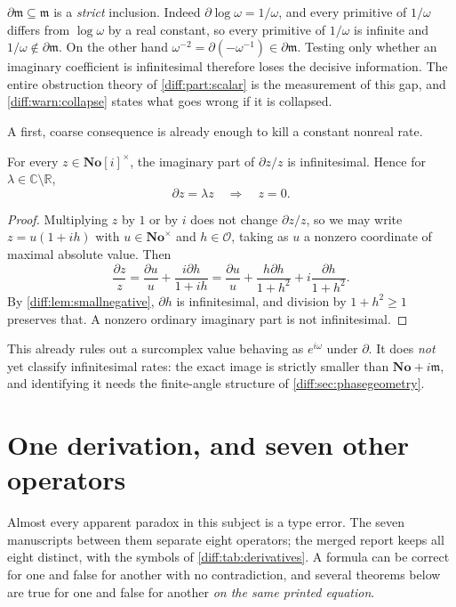 \documentclass[11pt,letterpaper]{article}
\numberwithin{equation}{section}
\theoremstyle{definition}
\theoremstyle{remark}
\newcommand{\No}{\mathbf{No}}
\newcommand{\SC}{\mathbf{No}[i]}
\newcommand{\R}{\mathbb R}
\newcommand{\C}{\mathbb C}
\newcommand{\der}{\partial}
\newcommand{\Ofin}{\mathcal O}
\newcommand{\mm}{\mathfrak m}
\begin{document}
\begin{warning}
\label{diff:warn:strict}
$\der\mm\subseteq\mm$ is a \emph{strict} inclusion. Indeed
$\der\log\omega=1/\omega$, and every primitive of $1/\omega$ differs from
$\log\omega$ by a real constant, so every primitive of $1/\omega$ is infinite
and $1/\omega\notin\der\mm$. On the other hand
$\omega^{-2}=\der(-\omega^{-1})\in\der\mm$. Testing only whether an imaginary
coefficient is infinitesimal therefore loses the decisive information. The
entire obstruction theory of \cref{diff:part:scalar} is the measurement of this
gap, and \cref{diff:warn:collapse} states what goes wrong if it is collapsed.
\end{warning}

A first, coarse consequence is already enough to kill a constant nonreal rate.

\begin{proposition}
\label{diff:prop:coarse}
For every $z\in\SC^{\times}$, the imaginary part of $\der z/z$ is
infinitesimal. Hence for $\lambda\in\C\setminus\R$,
\[
 \der z=\lambda z\quad\Longrightarrow\quad z=0 .
\]
\end{proposition}
\begin{proof}
Multiplying $z$ by $1$ or by $i$ does not change $\der z/z$, so we may write
$z=u(1+ih)$ with $u\in\No^{\times}$ and $h\in\Ofin$, taking as $u$ a nonzero
coordinate of maximal absolute value. Then
\[
 \frac{\der z}{z}=\frac{\der u}{u}+\frac{i\der h}{1+ih}
 =\frac{\der u}{u}+\frac{h\der h}{1+h^{2}}+i\frac{\der h}{1+h^{2}} .
\]
By \cref{diff:lem:smallnegative}, $\der h$ is infinitesimal, and division by
$1+h^{2}\geq1$ preserves that. A nonzero ordinary imaginary part is not
infinitesimal.
\end{proof}

This already rules out a surcomplex value behaving as $e^{i\omega}$ under
$\der$. It does \emph{not} yet classify infinitesimal rates: the exact image
is strictly smaller than $\No+i\mm$, and identifying it needs the finite-angle
structure of \cref{diff:sec:phasegeometry}.

\section{One derivation, and seven other operators}
\label{diff:sec:taxonomy}

Almost every apparent paradox in this subject is a type error. The seven
manuscripts between them separate eight operators; the merged report keeps all
eight distinct, with the symbols of \cref{diff:tab:derivatives}. A formula can
be correct for one and false for another with no contradiction, and several
theorems below are true for one and false for another \emph{on the same printed
equation}.
\end{document}
